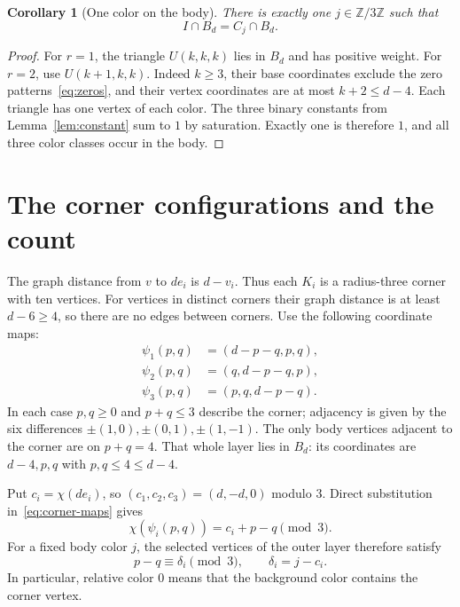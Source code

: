 \documentclass[11pt]{article}
\newtheorem{corollary}[theorem]{Corollary}
\newcommand{\Z}{\mathbb Z}
\begin{document}
\begin{corollary}[One color on the body]\label{cor:body}
There is exactly one \(j\in\Z/3\Z\) such that
\[
 I\cap B_d=C_j\cap B_d.
\]
\end{corollary}

\begin{proof}
For \(r=1\), the triangle \(U(k,k,k)\) lies in \(B_d\) and has
positive weight. For \(r=2\), use \(U(k+1,k,k)\).
Indeed \(k\geq3\), their base coordinates exclude the zero
patterns~\eqref{eq:zeros}, and their vertex coordinates are at most
\(k+2\leq d-4\).
Each triangle has one vertex of each color. The three binary
constants from Lemma~\ref{lem:constant} sum to \(1\) by saturation.
Exactly one is therefore \(1\), and all three color classes occur
in the body.
\end{proof}

\section{The corner configurations and the count}\label{sec:corners}

The graph distance from \(v\) to \(de_i\) is \(d-v_i\).
Thus each \(K_i\) is a radius-three corner with ten vertices.
For vertices in distinct corners their graph distance is at least
\(d-6\geq4\), so there are no edges between corners.
Use the following coordinate maps:
\begin{equation}\label{eq:corner-maps}
 \begin{aligned}
 \psi_1(p,q)&=(d-p-q,p,q),\\
 \psi_2(p,q)&=(q,d-p-q,p),\\
 \psi_3(p,q)&=(p,q,d-p-q).
 \end{aligned}
\end{equation}
In each case \(p,q\geq0\) and \(p+q\leq3\) describe the corner;
adjacency is given by the six differences
\(\pm(1,0),\pm(0,1),\pm(1,-1)\).
The only body vertices adjacent to the corner are on \(p+q=4\).
That whole layer lies in \(B_d\): its coordinates are \(d-4,p,q\)
with \(p,q\leq4\leq d-4\).

Put \(c_i=\chi(de_i)\), so \((c_1,c_2,c_3)=(d,-d,0)\) modulo \(3\).
Direct substitution in~\eqref{eq:corner-maps} gives
\[
 \chi(\psi_i(p,q))=c_i+p-q\pmod3.
\]
For a fixed body color \(j\), the selected vertices of the outer
layer therefore satisfy
\[
 p-q\equiv\delta_i\pmod3,\qquad \delta_i=j-c_i.
\]
In particular, relative color \(0\) means that the background color
contains the corner vertex.
\end{document}

